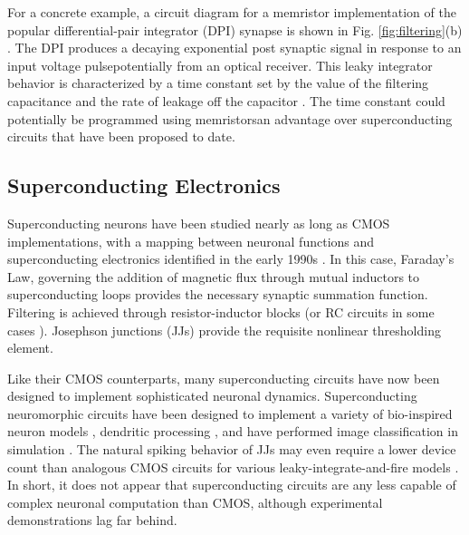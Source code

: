 \documentclass[twocolumn]{article}
\begin{document}
For a concrete example, a circuit diagram for a memristor implementation of the popular differential-pair integrator (DPI) synapse is shown in Fig. \ref{fig:filtering}(b) \cite{dalgaty2019hybrid}. The DPI produces a decaying exponential post synaptic signal in response to an input voltage pulse\textemdash potentially from an optical receiver. This leaky integrator behavior is characterized by a time constant set by the value of the filtering capacitance and the rate of leakage off the capacitor \cite{chicca2014neuromorphic}. The time constant could potentially be programmed using memristors\textemdash an advantage over superconducting circuits that have been proposed to date.

\subsection{Superconducting Electronics}
Superconducting neurons have been studied nearly as long as CMOS implementations, with a mapping between neuronal functions and superconducting electronics identified in the early 1990s \cite{hago1991, hiak1991}. In this case, Faraday's Law, governing the addition of magnetic flux through mutual inductors to superconducting loops provides the necessary synaptic summation function. Filtering is achieved through resistor-inductor blocks (or RC circuits in some cases \cite{crotty2010josephson}). Josephson junctions (JJs) provide the requisite nonlinear thresholding element.

Like their CMOS counterparts, many superconducting circuits have now been designed to implement sophisticated neuronal dynamics. Superconducting neuromorphic circuits have been designed to implement a variety of bio-inspired neuron models \cite{crotty2010josephson, toomey2019design, schneider2018tutorial}, dendritic processing \cite{shainline2019fluxonic}, and have performed image classification in simulation \cite{schneider2017energy}. The natural spiking behavior of JJs may even require a lower device count than analogous CMOS circuits for various leaky-integrate-and-fire models \cite{crotty2010josephson}. In short, it does not appear that superconducting circuits are any less capable of complex neuronal computation than CMOS, although experimental demonstrations lag far behind.
\end{document}
